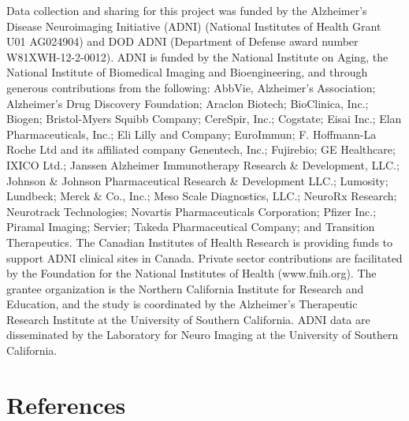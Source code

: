 \documentclass[
  12pt,
]{article}
\begin{document}
Data collection and sharing for this project was funded by the
Alzheimer's Disease Neuroimaging Initiative (ADNI) (National Institutes
of Health Grant U01 AG024904) and DOD ADNI (Department of Defense award
number W81XWH-12-2-0012). ADNI is funded by the National Institute on
Aging, the National Institute of Biomedical Imaging and Bioengineering,
and through generous contributions from the following: AbbVie,
Alzheimer's Association; Alzheimer's Drug Discovery Foundation; Araclon
Biotech; BioClinica, Inc.; Biogen; Bristol-Myers Squibb Company;
CereSpir, Inc.; Cogstate; Eisai Inc.; Elan Pharmaceuticals, Inc.; Eli
Lilly and Company; EuroImmun; F. Hoffmann-La Roche Ltd and its
affiliated company Genentech, Inc.; Fujirebio; GE Healthcare; IXICO
Ltd.; Janssen Alzheimer Immunotherapy Research \& Development, LLC.;
Johnson \& Johnson Pharmaceutical Research \& Development LLC.;
Lumosity; Lundbeck; Merck \& Co., Inc.; Meso Scale Diagnostics, LLC.;
NeuroRx Research; Neurotrack Technologies; Novartis Pharmaceuticals
Corporation; Pfizer Inc.; Piramal Imaging; Servier; Takeda
Pharmaceutical Company; and Transition Therapeutics. The Canadian
Institutes of Health Research is providing funds to support ADNI
clinical sites in Canada. Private sector contributions are facilitated
by the Foundation for the National Institutes of Health (www.fnih.org).
The grantee organization is the Northern California Institute for
Research and Education, and the study is coordinated by the Alzheimer's
Therapeutic Research Institute at the University of Southern California.
ADNI data are disseminated by the Laboratory for Neuro Imaging at the
University of Southern California. \newpage

\hypertarget{references}{%
\section*{References}\label{references}}
\end{document}
